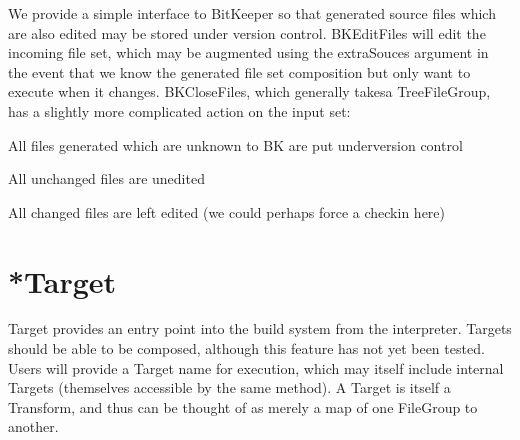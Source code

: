 We provide a simple interface to BitKeeper so that generated source files which are also edited may be stored under
version control. BKEditFiles will edit the incoming file set, which may be augmented using the extraSouces argument in
the event that we know the generated file set composition but only want to execute when it changes. BKCloseFiles, which
generally takesa TreeFileGroup, has a slightly more complicated action on the input set:
\begin{\itemize}
  \item All files generated which are unknown to BK are put underversion control
  \item All unchanged files are unedited
  \item All changed files are left edited (we could perhaps force a checkin here)
\end{\itemize}

\section{*Target}

Target provides an entry point into the build system from the interpreter. Targets should be able to be composed,
although this feature has not yet been tested. Users will provide a Target name for execution, which may itself include
internal Targets (themselves accessible by the same method). A Target is itself a Transform, and thus can be thought of
as merely a map of one FileGroup to another.
